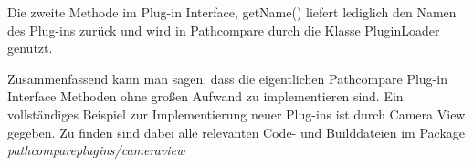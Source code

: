 Die zweite Methode im Plug-in Interface, getName() liefert lediglich den Namen
des Plug-ins zurück und wird in Pathcompare durch die Klasse PluginLoader
genutzt.

Zusammenfassend kann man sagen, dass die eigentlichen Pathcompare Plug-in Interface
Methoden ohne großen Aufwand zu implementieren sind. Ein vollständiges
Beispiel zur Implementierung neuer Plug-ins ist durch Camera View gegeben.
Zu finden sind dabei alle relevanten Code- und Builddateien im Package 
\textit{pathcompareplugins/cameraview}

